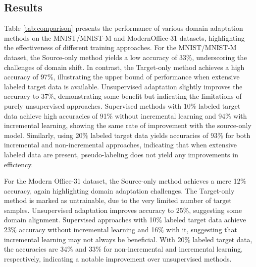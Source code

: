 \documentclass{article}
\begin{document}
	
	\subsection{Results}
	
	Table \ref{tab:comparison} presents the performance of various domain adaptation methods on the MNIST/MNIST-M and ModernOffice-31 datasets, highlighting the effectiveness of different training approaches. For the MNIST/MNIST-M dataset, the Source-only method yields a low accuracy of 33\%, underscoring the challenges of domain shift. In contrast, the Target-only method achieves a high accuracy of 97\%, illustrating the upper bound of performance when extensive labeled target data is available. Unsupervised adaptation slightly improves the accuracy to 37\%, demonstrating some benefit but indicating the limitations of purely unsupervised approaches. Supervised methods with 10\% labeled target data achieve high accuracies of 91\% without incremental learning and 94\% with incremental learning, showing the same rate of improvement with the source-only model. Similarly, using 20\% labeled target data yields accuracies of 93\% for both incremental and non-incremental approaches, indicating that when extensive labeled data are present, pseudo-labeling does not yield any improvements in efficiency.
	
	For the Modern Office-31 dataset, the Source-only method achieves a mere 12\% accuracy, again highlighting domain adaptation challenges. The Target-only method is marked as untrainable, due to the very limited number of target samples. Unsupervised adaptation improves accuracy to 25\%, suggesting some domain alignment. Supervised approaches with 10\% labeled target data achieve 23\% accuracy without incremental learning and 16\% with it, suggesting that incremental learning may not always be beneficial. With 20\% labeled target data, the accuracies are 34\% and 33\% for non-incremental and incremental learning, respectively, indicating a notable improvement over unsupervised methods. 

	
\end{document}
